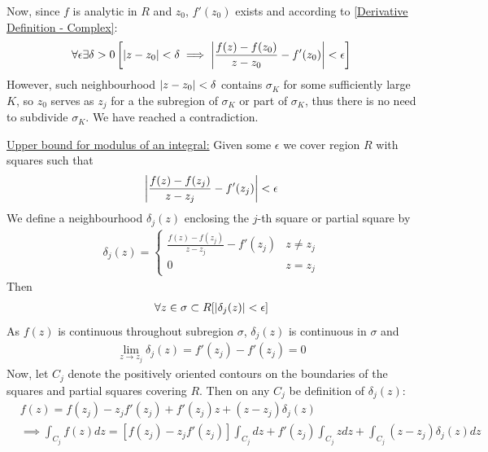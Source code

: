 \documentclass[12pt, english]{book}
\makeatletter
\renewenvironment{proof}[1][\proofname]{\par
	\pushQED{\qed}%
	\normalfont \topsep6\p@\@plus6\p@\relax
	\list{}{%
		\settowidth{\leftmargin}{\itshape\proofname:\hskip\labelsep}%
		\setlength{\labelwidth}{0pt}%
		\setlength{\itemindent}{-\leftmargin}%
	}%
	\item[\hskip\labelsep\itshape#1\@addpunct{:}]\ignorespaces
	}{ \popQED\endlist\@endpefalse}
\makeatother
\begin{document}
\begin{proof}
\begin{proof}
			Now, since \(f\) is analytic in \(R\) and \(z_0\), \(f'(z_0)\) exists and according to \cref{Derivative Definition - Complex}:
			\begin{align*}
				\forall \epsilon \exists \delta >0 
				\left[\abs{z - z_0}< \delta \implies \abs{\frac{f(z) - f(z_0)}{z - z_0} - f'(z_0)} < \epsilon \right]
			\end{align*}
			However, such neighbourhood \(\abs{z-z_0}<\delta\) contains \(\sigma_K\) for some sufficiently large \(K\), so \(z_0\) serves as \(z_j\) for a the subregion of \(\sigma_K\) or part of \(\sigma_K\), thus there is no need to subdivide \(\sigma_K\). We have reached a contradiction.
		\end{proof}
	
		\underline{Upper bound for modulus of an integral:} \newline \newline
		Given some \(\epsilon\) we cover region \(R\) with squares such that
		\begin{align*}
			\abs{\frac{f(z) - f(z_j)}{z - z_j} - f'(z_j)} < \epsilon
		\end{align*}
		We define a neighbourhood \(\delta_j(z)\) enclosing the \(j\)-th square or partial square by
		\begin{align*}
			\delta_j(z) = 
			\begin{cases}
				\frac{f(z) - f(z_j)}{z-z_j} - f'(z_j) & z \neq z_j \\
				0 & z = z_j
			\end{cases}
		\end{align*}
		Then 
		\begin{align*}
			\forall z \in \sigma \subset R [\abs{\delta_j (z)} < \epsilon]
		\end{align*}
		As \(f(z)\) is continuous throughout subregion \(\sigma\),  \(\delta_j(z)\) is continuous in \(\sigma\) and 
		\begin{align*}
			\lim_{z \rightarrow z_j} \delta_j(z) = f'(z_j) - f'(z_j) = 0
		\end{align*}
		Now, let \(C_j\) denote the positively oriented contours on the boundaries of the squares and partial squares covering \(R\). Then on any \(C_j\) be definition of \(\delta_j(z)\):
		\begin{align*}
			&f(z) = f(z_j) - z_j f'(z_j) + f'(z_j) z + (z - z_j) \delta_j(z) \\
			&\implies \int_{C_j} f(z) dz = [f(z_j) - z_j f'(z_j)] \int_{C_j} dz + f'(z_j) \int_{C_j} z dz + \int_{C_j} (z - z_j) \delta_j(z) dz
		\end{align*}

\end{proof}
\end{document}
